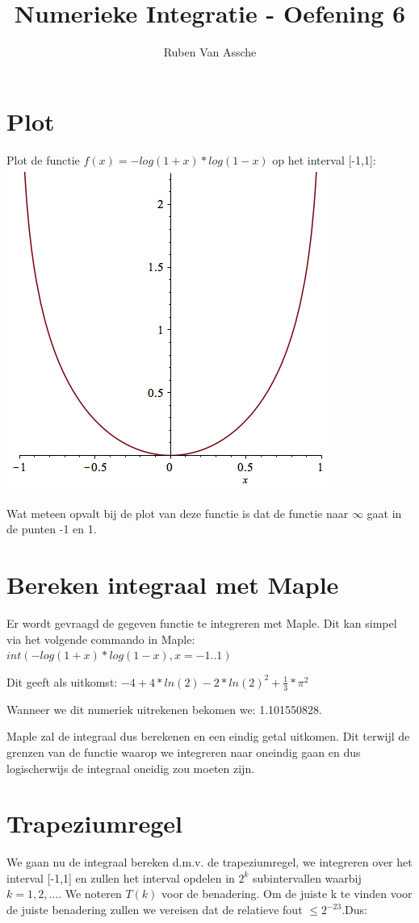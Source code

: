 \documentclass{article}
\author{Ruben Van Assche}
\title{Numerieke Integratie - Oefening 6}
\begin{document}
 \maketitle
 \begin{flushleft}
\section{Plot}
Plot de functie $f(x) = -log(1+x)*log(1-x) $ op het interval [-1,1]:
\includegraphics[scale=0.6]{Plot}

Wat meteen opvalt bij de plot van deze functie is dat de functie naar $\infty$ gaat in de punten -1 en 1.
\section{Bereken integraal met Maple}
Er wordt gevraagd de gegeven functie te integreren met Maple. Dit kan simpel via het volgende commando in Maple:
$ int(-log(1+x)*log(1-x), x = -1 .. 1) $
\newline

Dit geeft als uitkomst: $ -4+4*ln(2)-2*ln(2)^{2}+\frac{1}{3}*\pi^{2} $
\newline

Wanneer we dit numeriek uitrekenen bekomen we: 1.101550828.
\newline

Maple zal de integraal dus berekenen en een eindig getal uitkomen. Dit terwijl de grenzen van de functie waarop we integreren naar oneindig gaan en dus logischerwijs de integraal oneidig zou moeten zijn.
\section{Trapeziumregel}
We gaan nu de integraal bereken d.m.v. de trapeziumregel, we integreren over het interval [-1,1] en zullen het interval opdelen in $ 2^{k} $ subintervallen waarbij $ k = 1, 2, ...$. We noteren $T(k)$ voor de benadering.
\newline
Om de juiste k te vinden voor de juiste benadering zullen we vereisen dat de relatieve fout  $\leq 2^{-23}$.Dus:
\newline


\end{flushleft}
\end{document}
